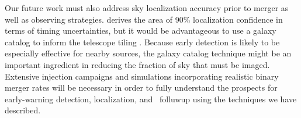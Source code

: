 Our future work must also address sky localization accuracy prior to merger as well as
observing strategies.  \citep{Fairhurst2009} derives the area of 90\% localization
confidence in terms of timing uncertainties, but it would be advantageous to use
a galaxy catalog to inform the telescope tiling \citep{galaxy-catalog}.  Because
early detection is likely to be especially effective for nearby sources, the galaxy
catalog technique might be an important ingredient in reducing the fraction of
sky that must be imaged.  Extensive injection campaigns and simulations
incorporating realistic binary merger rates will be necessary in order to fully
understand the prospects for early-warning detection, localization, and \EM\ folluwup
using the techniques we have described.



